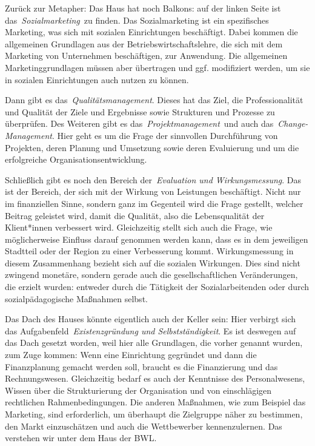 \documentclass[
  letterpaper,
]{book}
\begin{document}
Zurück zur Metapher: Das Haus hat noch Balkons: auf der linken Seite ist
das~\emph{Sozialmarketing}~zu finden. Das Sozialmarketing ist ein
spezifisches Marketing, was sich mit sozialen Einrichtungen beschäftigt.
Dabei kommen die allgemeinen Grundlagen aus der
Betriebswirtschaftslehre, die sich mit dem Marketing von Unternehmen
beschäftigen, zur Anwendung. Die allgemeinen Marketinggrundlagen müssen
aber übertragen und ggf. modifiziert werden, um sie in sozialen
Einrichtungen auch nutzen zu können.

Dann gibt es das~\emph{Qualitätsmanagement}. Dieses hat das Ziel, die
Professionalität und Qualität der Ziele und Ergebnisse sowie Strukturen
und Prozesse zu überprüfen. Des Weiteren gibt es
das~\emph{Projektmanagement}~und auch das~\emph{Change-Management}. Hier
geht es um die Frage der sinnvollen Durchführung von Projekten, deren
Planung und Umsetzung sowie deren Evaluierung und um die erfolgreiche
Organisationsentwicklung.

Schließlich gibt es noch den Bereich der~\emph{Evaluation und
Wirkungsmessung}. Das ist der Bereich, der sich mit der Wirkung von
Leistungen beschäftigt. Nicht nur im finanziellen Sinne, sondern ganz im
Gegenteil wird die Frage gestellt, welcher Beitrag geleistet wird, damit
die Qualität, also die Lebensqualität der Klient*innen verbessert wird.
Gleichzeitig stellt sich auch die Frage, wie möglicherweise Einfluss
darauf genommen werden kann, dass es in dem jeweiligen Stadtteil oder
der Region zu einer Verbesserung kommt. Wirkungsmessung in diesem
Zusammenhang bezieht sich auf die sozialen Wirkungen. Dies sind nicht
zwingend monetäre, sondern gerade auch die gesellschaftlichen
Veränderungen, die erzielt wurden: entweder durch die Tätigkeit der
Sozialarbeitenden oder durch sozialpädagogische Maßnahmen selbst.

Das Dach des Hauses könnte eigentlich auch der Keller sein: Hier
verbirgt sich das Aufgabenfeld~\emph{Existenzgründung und
Selbstständigkeit}. Es ist deswegen auf das Dach gesetzt worden, weil
hier alle Grundlagen, die vorher genannt wurden, zum Zuge kommen: Wenn
eine Einrichtung gegründet und dann die Finanzplanung gemacht werden
soll, braucht es die Finanzierung und das Rechnungswesen. Gleichzeitig
bedarf es auch der Kenntnisse des Personalwesens, Wissen über die
Strukturierung der Organisation und von einschlägigen rechtlichen
Rahmenbedingungen. Die anderen Maßnahmen, wie zum Beispiel das
Marketing, sind erforderlich, um überhaupt die Zielgruppe näher zu
bestimmen, den Markt einzuschätzen und auch die Wettbewerber
kennenzulernen. Das verstehen wir unter dem Haus der BWL.
\end{document}
